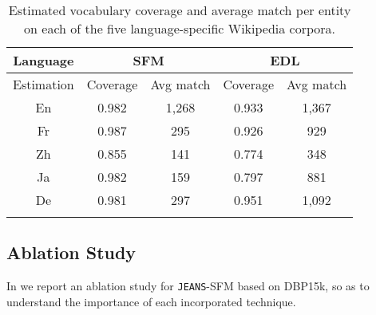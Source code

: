 \documentclass[11pt,a4paper]{article}
\newcommand{\modelname}[0]{\texttt{JEANS}\xspace}
\def\bhline{\specialrule{.2em}{0em}{0em}}
\begin{document}
{
\begin{table}[t]
\setlength\tabcolsep{2pt}
\centering
\footnotesize
\begin{tabular}{c|cc|cc}
\bhline
Language&\multicolumn{2}{c|}{SFM}&\multicolumn{2}{c}{EDL}\\
\hline
Estimation&Coverage&Avg match&Coverage&Avg match\\
\hline
En&0.982&1,268&0.933&1,367\\
Fr&0.987&295&0.926&929\\
Zh&0.855&141&0.774&348\\
Ja&0.982&159&0.797&881\\
De&0.981&297&0.951&1,092\\
\bhline
\end{tabular}
\caption{Estimated vocabulary coverage and average match per entity on each of the five language-specific Wikipedia corpora. }\label{tbl:statgrounding}
\end{table}
} 

\subsection{Ablation Study}

In  we report an ablation study for \modelname-SFM based on DBP15k, so as to understand the importance of each incorporated technique.
\end{document}
